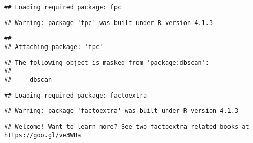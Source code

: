 \documentclass[
]{article}
\begin{document}
\begin{verbatim}
## Loading required package: fpc
\end{verbatim}

\begin{verbatim}
## Warning: package 'fpc' was built under R version 4.1.3
\end{verbatim}

\begin{verbatim}
## 
## Attaching package: 'fpc'
\end{verbatim}

\begin{verbatim}
## The following object is masked from 'package:dbscan':
## 
##     dbscan
\end{verbatim}

\begin{verbatim}
## Loading required package: factoextra
\end{verbatim}

\begin{verbatim}
## Warning: package 'factoextra' was built under R version 4.1.3
\end{verbatim}

\begin{verbatim}
## Welcome! Want to learn more? See two factoextra-related books at https://goo.gl/ve3WBa
\end{verbatim}
\end{document}

